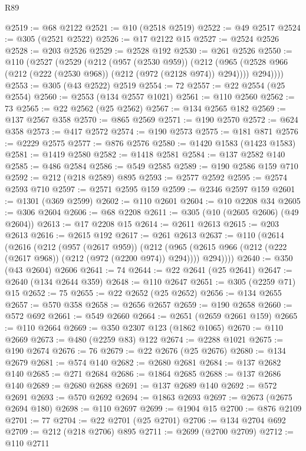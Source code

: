 \begin{lexlean}{R89}
\begin{coremodule}
@2519 := @68 @2122
@2521 := @10 (@2518 @2519)
@2522 := @49 @2517
@2524 := @305 (@2521 @2522)
@2526 := @17 @2122 @15
@2527 := @2524 @2526
@2528 := @203 @2526
@2529 := @2528 @192
@2530 := @261 @2526
@2550 := @110
    (@2527
      (@2529
        (@212
          (@957 (@2530 @959))
          (@212
            (@965 (@2528 @966 (@212 (@222 (@2530 @968)) (@212 (@972 (@2128 @974)) @294))))
            @294))))
@2553 := @305 (@43 @2522) @2519
@2554 := 72
@2557 := @22 @2554 (@25 @2554)
@2560 := @2553 (@134 @2557 @1021)
@2561 := @110 @2560
@2562 := 73
@2565 := @22 @2562 (@25 @2562)
@2567 := @134 @2565 @182
@2569 := @137 @2567 @358
@2570 := @865 @2569
@2571 := @190 @2570
@2572 := @624 @358
@2573 := @417 @2572
@2574 := @190 @2573
@2575 := @181 @871
@2576 := @2229 @2575
@2577 := @876 @2576
@2580 := @1420 @1583 (@1423 @1583)
@2581 := @1419 @2580
@2582 := @1418 @2581
@2584 := @137 @2582 @140
@2585 := @486 @2584
@2586 := @549 @2585
@2589 := @190 @2586 @159 @710
@2592 := @212 (@218 @2589) @895
@2593 := @2577 @2592
@2595 := @2574 @2593 @710
@2597 := @2571 @2595 @159
@2599 := @2346 @2597 @159
@2601 := @1301 (@369 @2599)
@2602 := @110 @2601
@2604 := @10 @2208 @34
@2605 := @306 @2604
@2606 := @68 @2208
@2611 := @305 (@10 (@2605 @2606) (@49 @2604))
@2613 := @17 @2208 @15
@2614 := @2611 @2613
@2615 := @203 @2613
@2616 := @2615 @192
@2617 := @261 @2613
@2637 := @110
    (@2614
      (@2616
        (@212
          (@957 (@2617 @959))
          (@212
            (@965 (@2615 @966 (@212 (@222 (@2617 @968)) (@212 (@972 (@2200 @974)) @294))))
            @294))))
@2640 := @350 (@43 @2604) @2606
@2641 := 74
@2644 := @22 @2641 (@25 @2641)
@2647 := @2640 (@134 @2644 @359)
@2648 := @110 @2647
@2651 := @305 (@2259 @71) @15
@2652 := 75
@2655 := @22 @2652 (@25 @2652)
@2656 := @134 @2655
@2657 := @570 @358
@2658 := @2656 @2657
@2659 := @190 @2658
@2660 := @572 @692
@2661 := @549 @2660
@2664 := @2651 (@2659 @2661 @159)
@2665 := @110 @2664
@2669 := @350 @2307 @123 (@1862 @1065)
@2670 := @110 @2669
@2673 := @480 (@2259 @83) @122
@2674 := @2288 @1021
@2675 := @190 @2674
@2676 := 76
@2679 := @22 @2676 (@25 @2676)
@2680 := @134 @2679
@2681 := @574 @140
@2682 := @2680 @2681
@2684 := @137 @2682 @140
@2685 := @271 @2684
@2686 := @1864 @2685
@2688 := @137 @2686 @140
@2689 := @2680 @2688
@2691 := @137 @2689 @140
@2692 := @572 @2691
@2693 := @570 @2692
@2694 := @1863 @2693
@2697 := @2673 (@2675 @2694 @180)
@2698 := @110 @2697
@2699 := @1904 @15
@2700 := @876 @2109
@2701 := 77
@2704 := @22 @2701 (@25 @2701)
@2706 := @134 @2704 @692
@2709 := @212 (@218 @2706) @895
@2711 := @2699 (@2700 @2709)
@2712 := @110 @2711

\end{coremodule}
\end{lexlean}
